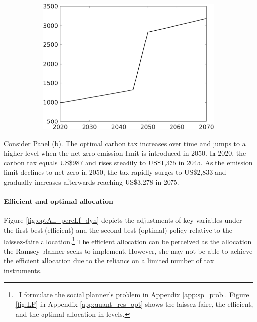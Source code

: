 \begin{figure}[h!!]
\begin{subfigure}{0.4\textwidth}
		\includegraphics[width=1\textwidth]{../../codding_model/own_basedOnFried/optimalPol_010922_revision/figures/all_13Sept22_Tplus30/Single_periods12_OPT_T_NoTaus_Tauf_regime4_spillover0_knspil0_noskill0_sep0_xgrowth0_extern0_PV1_sizeequ0_GOV0_etaa0.79.png}
	\end{subfigure}
\end{figure} 
Consider Panel (b). The optimal carbon tax increases over time and jumps to a higher level when the net-zero emission limit is introduced in 2050.
In 2020, the carbon tax equals US\$987 and rises steadily to US\$1,325 in 2045.  As the emission limit declines to net-zero in 2050, the tax rapidly surges to US\$2,833 and gradually increases afterwards reaching US\$3,278 in 2075. 
\paragraph{Efficient and optimal allocation}\label{subsec:notaul}

Figure \ref{fig:optAll_percLf_dyn} depicts the adjustments of key variables under the first-best (efficient) and the second-best (optimal) policy relative to the laissez-faire allocation.\footnote{\ I formulate the social planner's problem in Appendix \ref{app:sp_prob}.  Figure \ref{fig:LF} in Appendix \ref{app:quant_res_opt} shows the laissez-faire, the efficient, and the optimal allocation in levels.} 
The efficient allocation can be perceived as the allocation the Ramsey planner seeks to implement. However, she may not be able to achieve the efficient allocation due to the reliance on a limited number of tax instruments.

